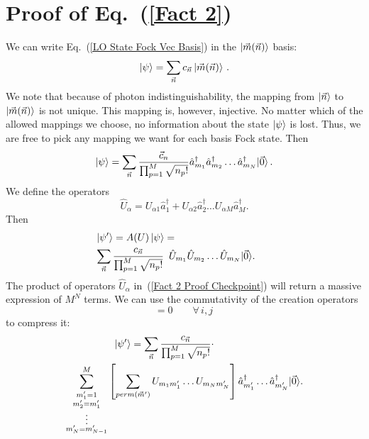 \documentclass[aps,pra,twocolumn,showpacs,superscriptaddress,floatfix,10pt]{revtex4}
\begin{document}
\section{Proof of Eq.~(\ref{Fact 2})}
\label{Proof of Fact 2}
We can write Eq.~(\ref{LO State Fock Vec Basis}) in the $\ket{\vec{m}(\vec{n})}$ basis:
\begin{equation}
\ket{\psi} = \sum_{\vec{n}} c_{\vec{n}} \ket{\vec{m}(\vec{n})} \,.
\end{equation}
We note that because of photon indistinguishability, the mapping from $\ket{\vec{n}}$ to $\ket{\vec{m}(\vec{n})}$ is not unique.  This mapping is, however, injective. No matter which of the allowed mappings we choose, no information about the state $\ket{\psi}$ is lost. Thus, we are free to pick any mapping we want for each basis Fock state. Then
\begin{equation}
\ket{\psi} = \sum_{\vec{n}} \frac{\vec{c}_n}{\prod_{p=1}^{M} \sqrt{n_p !}} \hat{a}_{m_1}^\dagger \hat{a}_{m_2}^\dagger \dots \hat{a}_{m_N}^\dagger |\vec{0} \rangle \,.
\end{equation}
We define the operators
\begin{equation}
\hat{U}_\alpha = U_{\alpha 1} \hat{a}^\dagger_1 + U_{\alpha 2} \hat{a}^\dagger_2 \dots U_{\alpha M} \hat{a}^\dagger_M.
\end{equation}
Then
\begin{eqnarray}
\label{Fact 2 Proof Checkpoint}
& \ket{\psi^\prime} = A(U) \ket{\psi} =  \quad \quad \quad \quad \quad \quad \quad \quad \quad \quad \\ & \nonumber
\sum_{\vec{n}} \frac{c_{\vec{n}}}{\prod_{p=1}^{M} \sqrt{n_p !}} \enspace \hat{U}_{m_1}  \hat{U}_{m_2}  \dots  \hat{U}_{m_N} |\vec{0} \rangle.
\end{eqnarray}
The product of operators $\hat{U}_\alpha$ in~(\ref{Fact 2 Proof Checkpoint}) will return a massive expression of $M^N$ terms. We can use the commutativity of the creation operators 
\begin{equation}
[\hat{a}_i ^ \dagger,\hat{a}_j ^ \dagger] = 0 \quad \quad \forall\, i,j \,
\end{equation}
to compress it:
\newline
\newline\newline \newline \newline
\begin{eqnarray}
\ket{\psi^\prime} = \sum_{\vec{n}} \frac{c_{\vec{n}}}{\prod_{p=1}^{M} \sqrt{n_p !}} \cdot \quad \quad \quad \quad \quad \quad \quad \quad \quad \\  \nonumber \sum^M_{\substack{m_1^\prime = 1\\
		m_2^\prime = m_1^\prime\\
		\vdots \\
		m_N^\prime = m_{N-1}^\prime}}
\left[ \sum_{perm(\vec{m}^\prime)} U_{m_1 m_1^\prime} \dots U_{m_N m_N^\prime} \right] \hat{a}_{m_1^\prime}^\dagger \dots \hat{a}_{m_N^\prime}^\dagger |\vec{0} \rangle.
\end{eqnarray}
\end{document}
